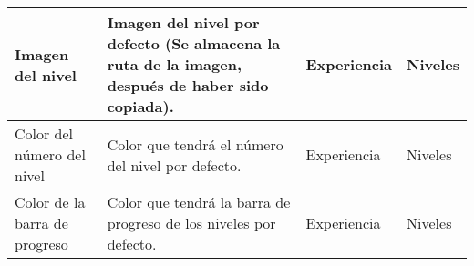 \begin{center}
\begin{tabular}{| m{} | m{} | m{} | m{}|}
        Imagen del nivel &
            Imagen del nivel por defecto (Se almacena la ruta de la imagen, después de haber sido copiada). &
            Experiencia & Niveles \\\hline 
        
        Color del número del nivel &
            Color que tendrá el número del nivel por defecto. &
            Experiencia & Niveles \\\hline 
        
        Color de la barra de progreso &
            Color que tendrá la barra de progreso de los niveles por defecto. &
            Experiencia & Niveles \\\hline
            
    \end{tabular}%
    \end{center}%
    
\clearpage    
    
